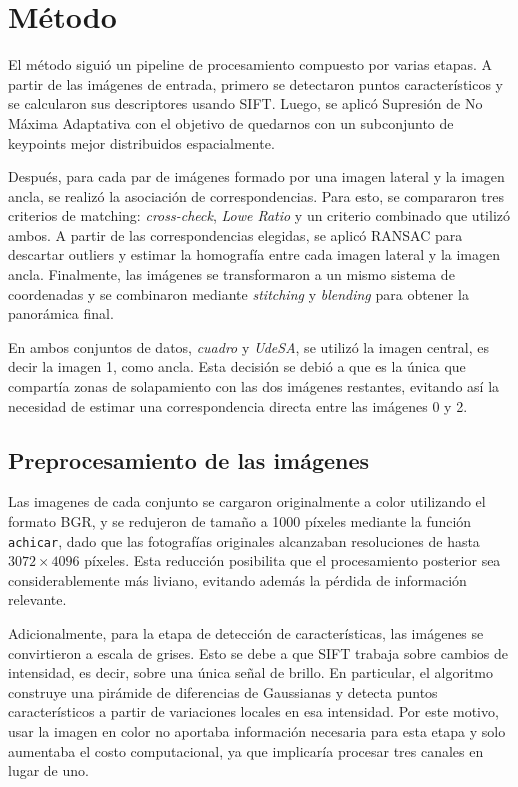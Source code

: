 \documentclass[a4paper,11pt]{article}
\begin{document}
\newpage

\section{Método}

El método siguió un pipeline de procesamiento compuesto por varias etapas. A partir de las imágenes de entrada, primero se detectaron puntos característicos y se calcularon sus descriptores usando SIFT. Luego, se aplicó Supresión de No Máxima Adaptativa con el objetivo de quedarnos con un subconjunto de keypoints mejor distribuidos espacialmente.

Después, para cada par de imágenes formado por una imagen lateral y la imagen ancla, se realizó la asociación de correspondencias. Para esto, se compararon tres criterios de matching: \textit{cross-check}, \textit{Lowe Ratio} y un criterio combinado que utilizó ambos. A partir de las correspondencias elegidas, se aplicó RANSAC para descartar outliers y estimar la homografía entre cada imagen lateral y la imagen ancla. Finalmente, las imágenes se transformaron a un mismo sistema de coordenadas y se combinaron mediante \textit{stitching} y \textit{blending} para obtener la panorámica final.

En ambos conjuntos de datos, \textit{cuadro} y \textit{UdeSA}, se utilizó la imagen central, es decir la imagen 1, como ancla. Esta decisión se debió a que es la única que compartía zonas de solapamiento con las dos imágenes restantes, evitando así la necesidad de estimar una correspondencia directa entre las imágenes 0 y 2.

\subsection*{Preprocesamiento de las imágenes}

Las imagenes de cada conjunto se cargaron originalmente a color utilizando el formato BGR, y se redujeron de tamaño a 1000 píxeles mediante la función \texttt{achicar}, dado que las fotografías originales alcanzaban resoluciones de hasta $3072\times4096$ píxeles. Esta reducción posibilita que el procesamiento posterior sea considerablemente más liviano, evitando además la pérdida de información relevante.

Adicionalmente, para la etapa de detección de características, las imágenes se convirtieron a escala de grises. Esto se debe a que SIFT trabaja sobre cambios de intensidad, es decir, sobre una única señal de brillo. En particular, el algoritmo construye una pirámide de diferencias de Gaussianas y detecta puntos característicos a partir de variaciones locales en esa intensidad. Por este motivo, usar la imagen en color no aportaba información necesaria para esta etapa y solo aumentaba el costo computacional, ya que implicaría procesar tres canales en lugar de uno.
\end{document}
